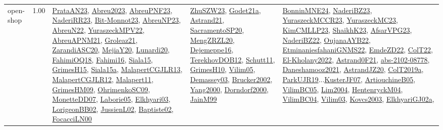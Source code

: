 {\begin{longtable}{p{3cm}r>{\raggedright\arraybackslash}p{6cm}>{\raggedright\arraybackslash}p{6cm}>{\raggedright\arraybackslash}p{8cm}}
\index{open-shop}\index{Concepts!open-shop}open-shop &  1.00 & \hyperref[detail:PrataAN23]{PrataAN23}, \hyperref[detail:Abreu2023]{Abreu2023}, \hyperref[detail:AbreuPNF23]{AbreuPNF23}, \hyperref[detail:NaderiRR23]{NaderiRR23}, \hyperref[detail:Bit-Monnot23]{Bit-Monnot23}, \hyperref[detail:AbreuNP23]{AbreuNP23}, \hyperref[detail:AbreuN22]{AbreuN22}, \hyperref[detail:YuraszeckMPV22]{YuraszeckMPV22}, \hyperref[detail:AbreuAPNM21]{AbreuAPNM21}, \hyperref[detail:Groleaz21]{Groleaz21}, \hyperref[detail:ZarandiASC20]{ZarandiASC20}, \hyperref[detail:MejiaY20]{MejiaY20}, \hyperref[detail:Lunardi20]{Lunardi20}, \hyperref[detail:FahimiOQ18]{FahimiOQ18}, \hyperref[detail:Fahimi16]{Fahimi16}, \hyperref[detail:Siala15]{Siala15}, \hyperref[detail:GrimesH15]{GrimesH15}, \hyperref[detail:Siala15a]{Siala15a}, \hyperref[detail:MalapertCGJLR13]{MalapertCGJLR13}, \hyperref[detail:MalapertCGJLR12]{MalapertCGJLR12}, \hyperref[detail:Malapert11]{Malapert11}, \hyperref[detail:GrimesHM09]{GrimesHM09}, \hyperref[detail:OhrimenkoSC09]{OhrimenkoSC09}, \hyperref[detail:MonetteDD07]{MonetteDD07}, \hyperref[detail:Laborie05]{Laborie05}, \hyperref[detail:Elkhyari03]{Elkhyari03}, \hyperref[detail:LorigeonBB02]{LorigeonBB02}, \hyperref[detail:JussienL02]{JussienL02}, \hyperref[detail:Baptiste02]{Baptiste02}, \hyperref[detail:FocacciLN00]{FocacciLN00} & \hyperref[detail:ZhuSZW23]{ZhuSZW23}, \hyperref[detail:Godet21a]{Godet21a}, \hyperref[detail:Astrand21]{Astrand21}, \hyperref[detail:SacramentoSP20]{SacramentoSP20}, \hyperref[detail:MengZRZL20]{MengZRZL20}, \hyperref[detail:Dejemeppe16]{Dejemeppe16}, \hyperref[detail:TerekhovDOB12]{TerekhovDOB12}, \hyperref[detail:Schutt11]{Schutt11}, \hyperref[detail:GrimesH10]{GrimesH10}, \hyperref[detail:Vilim05]{Vilim05}, \hyperref[detail:Demassey03]{Demassey03}, \hyperref[detail:Brucker2002]{Brucker2002}, \hyperref[detail:Yang2000]{Yang2000}, \hyperref[detail:Dorndorf2000]{Dorndorf2000}, \hyperref[detail:JainM99]{JainM99} & \hyperref[detail:BonninMNE24]{BonninMNE24}, \hyperref[detail:NaderiBZ23]{NaderiBZ23}, \hyperref[detail:YuraszeckMCCR23]{YuraszeckMCCR23}, \hyperref[detail:YuraszeckMC23]{YuraszeckMC23}, \hyperref[detail:KimCMLLP23]{KimCMLLP23}, \hyperref[detail:ShaikhK23]{ShaikhK23}, \hyperref[detail:AfsarVPG23]{AfsarVPG23}, \hyperref[detail:NaderiBZ22]{NaderiBZ22}, \hyperref[detail:OujanaAYB22]{OujanaAYB22}, \hyperref[detail:EtminaniesfahaniGNMS22]{EtminaniesfahaniGNMS22}, \hyperref[detail:EmdeZD22]{EmdeZD22}, \hyperref[detail:ColT22]{ColT22}, \hyperref[detail:El-Kholany2022]{El-Kholany2022}, \hyperref[detail:Astrand0F21]{Astrand0F21}, \hyperref[detail:abs-2102-08778]{abs-2102-08778}, \hyperref[detail:Daneshamooz2021]{Daneshamooz2021}, \hyperref[detail:AstrandJZ20]{AstrandJZ20}, \hyperref[detail:ColT2019a]{ColT2019a}, \hyperref[detail:ParkUJR19]{ParkUJR19}...\hyperref[detail:KusterJF07]{KusterJF07}, \hyperref[detail:ArtiouchineB05]{ArtiouchineB05}, \hyperref[detail:VilimBC05]{VilimBC05}, \hyperref[detail:Lim2004]{Lim2004}, \hyperref[detail:HentenryckM04]{HentenryckM04}, \hyperref[detail:VilimBC04]{VilimBC04}, \hyperref[detail:Vilim03]{Vilim03}, \hyperref[detail:Kovcs2003]{Kovcs2003}, \hyperref[detail:ElkhyariGJ02a]{ElkhyariGJ02a}, 
\end{longtable}}
